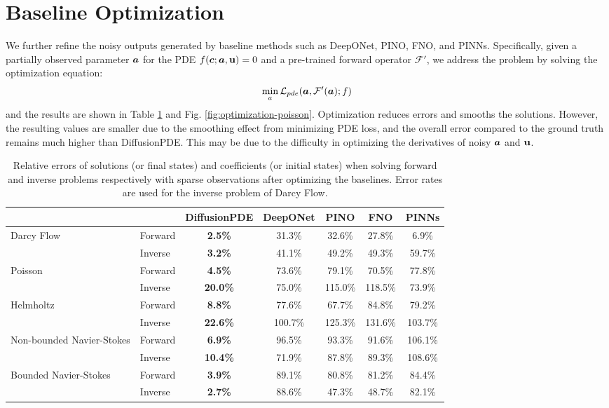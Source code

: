 \section{Baseline Optimization}\label{sec:baseline-optimization}

We further refine the noisy outputs generated by baseline methods such as DeepONet, PINO, FNO, and PINNs. Specifically, given a partially observed parameter $\boldsymbol{a}$ for the PDE $f(\boldsymbol{c}; \boldsymbol{a}, \mathbf{u}) = 0$ and a pre-trained forward operator $\mathcal{F}'$, we address the problem by solving the optimization equation:
\begin{equation}
     \mathop{\min}_{a}\mathcal{L}_{pde}(\boldsymbol{a}, \mathcal{F}'(\boldsymbol{a}); f)
\end{equation}
and the results are shown in Table \ref{table:optimization-errors} and Fig. \ref{fig:optimization-poisson}. Optimization reduces errors and smooths the solutions. However, the resulting values are smaller due to the smoothing effect from minimizing PDE loss, and the overall error compared to the ground truth remains much higher than DiffusionPDE. This may be due to the difficulty in optimizing the derivatives of noisy $\boldsymbol{a}$ and $\mathbf{u}$.

\begin{table}[t!]
    \caption{Relative errors of solutions (or final states) and coefficients (or initial states) when solving forward and inverse problems respectively with sparse observations after optimizing the baselines. Error rates are used for the inverse problem of Darcy Flow.}
    \label{table:optimization-errors}
    \centering
    \begin{tabular}{p{3cm}lccccc}
        \toprule
        & & DiffusionPDE & DeepONet & PINO & FNO & PINNs \\
        \midrule
        \multirow{2}{*}{Darcy Flow} & Forward & \textbf{2.5\%} & 31.3\% & 32.6\% & 27.8\% & 6.9\% \\
        & Inverse & \textbf{3.2\%} & 41.1\% & 49.2\% & 49.3\% & 59.7\% \\
        \midrule
        \multirow{2}{*}{Poisson} & Forward & \textbf{4.5\%} & 73.6\% & 79.1\% & 70.5\% & 77.8\% \\
        & Inverse & \textbf{20.0\%} & 75.0\% & 115.0\% & 118.5\% & 73.9\% \\
        \midrule
        \multirow{2}{*}{Helmholtz} & Forward & \textbf{8.8\%} & 77.6\% & 67.7\% & 84.8\% & 79.2\% \\
        & Inverse & \textbf{22.6\%} & 100.7\% & 125.3\% & 131.6\% & 103.7\% \\
        \midrule
        \multirow{2}{3cm}{Non-bounded Navier-Stokes} & Forward & \textbf{6.9\%} & 96.5\% & 93.3\% & 91.6\% & 106.1\% \\
        & Inverse & \textbf{10.4\%} & 71.9\% & 87.8\% & 89.3\% & 108.6\% \\
        \midrule
        \multirow{2}{3cm}{Bounded Navier-Stokes} & Forward & \textbf{3.9\%} & 89.1\% & 80.8\% & 81.2\% & 84.4\% \\
        & Inverse & \textbf{2.7\%} & 88.6\% & 47.3\% & 48.7\% & 82.1\% \\
        \bottomrule
    \end{tabular}
\end{table}

